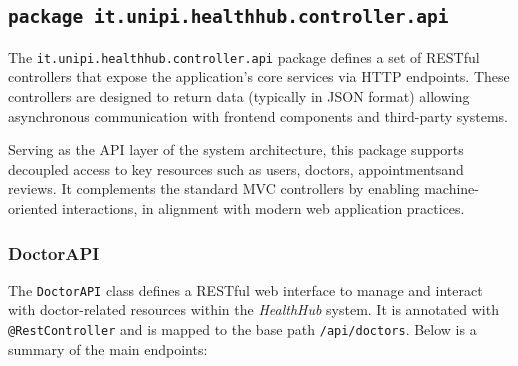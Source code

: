 \subsection{\texttt{package it.unipi.healthhub.controller.api}}
The \texttt{it.unipi.healthhub.controller.api} package defines a set of RESTful controllers that expose the application's core services via HTTP endpoints. These controllers are designed to return data (typically in JSON format) allowing asynchronous communication with frontend components and third-party systems.

Serving as the API layer of the system architecture, this package supports decoupled access to key resources such as users, doctors, appointmentsand reviews. It complements the standard MVC controllers by enabling machine-oriented interactions, in alignment with modern web application practices.

\subsubsection{DoctorAPI}
The \texttt{DoctorAPI} class defines a RESTful web interface to manage and interact with doctor-related resources within the \textit{HealthHub} system. It is annotated with \texttt{@RestController} and is mapped to the base path \texttt{/api/doctors}. Below is a summary of the main endpoints:

